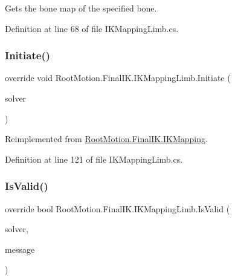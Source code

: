 Gets the bone map of the specified bone. 



Definition at line 68 of file I\+K\+Mapping\+Limb.\+cs.

\mbox{\label{class_root_motion_1_1_final_i_k_1_1_i_k_mapping_limb_abae95dfedf3c3b0742e0f368f0c02666}} 
\subsubsection{\texorpdfstring{Initiate()}{Initiate()}}
{\footnotesize\ttfamily override void Root\+Motion.\+Final\+I\+K.\+I\+K\+Mapping\+Limb.\+Initiate (\begin{DoxyParamCaption}\item[{\mbox{\hyperlink{class_root_motion_1_1_final_i_k_1_1_i_k_solver_full_body}{I\+K\+Solver\+Full\+Body}}}]{solver }\end{DoxyParamCaption})\hspace{0.3cm}{\ttfamily [virtual]}}



Reimplemented from \mbox{\hyperlink{class_root_motion_1_1_final_i_k_1_1_i_k_mapping_a530ab0e13f90bde214eba3a23ed24d73}{Root\+Motion.\+Final\+I\+K.\+I\+K\+Mapping}}.



Definition at line 121 of file I\+K\+Mapping\+Limb.\+cs.

\mbox{\label{class_root_motion_1_1_final_i_k_1_1_i_k_mapping_limb_a9c62050a36b238ef19332f8855fdb6e4}} 
\subsubsection{\texorpdfstring{Is\+Valid()}{IsValid()}}
{\footnotesize\ttfamily override bool Root\+Motion.\+Final\+I\+K.\+I\+K\+Mapping\+Limb.\+Is\+Valid (\begin{DoxyParamCaption}\item[{\mbox{\hyperlink{class_root_motion_1_1_final_i_k_1_1_i_k_solver}{I\+K\+Solver}}}]{solver,  }\item[{ref string}]{message }\end{DoxyParamCaption})\hspace{0.3cm}{\ttfamily [virtual]}}



